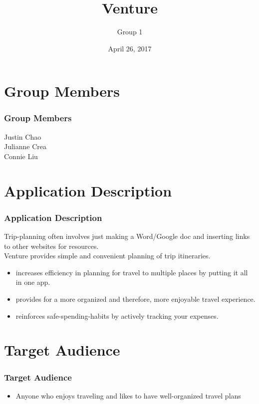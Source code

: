 \documentclass{beamer}
\title{Venture}
\author{Group 1}
\institute{CS 329E \\ The University of Texas at Austin}
\date{April 26, 2017}
\begin{document}
\frame{\titlepage}

\section{Group Members}
\begin{frame}
\frametitle{Group Members}
    \begin{center}
        Justin Chao \\
        Julianne Crea \\
        Connie Liu 
    \end{center}
\end{frame}

\section{Application Description}
\begin{frame}
\frametitle{Application Description}
        Trip-planning often involves just making a Word/Google doc and inserting links to
            other websites for resources. \\ 
        Venture provides simple and convenient planning of trip itineraries.
    \begin{itemize}
        \item increases efficiency in planning for travel to multiple places by putting it all in
            one app.
        \item provides for a more organized and therefore, more enjoyable travel experience.
        \item reinforces safe-spending-habits by actively tracking your expenses.
    \end{itemize}
\end{frame}

\section{Target Audience}
\begin{frame}
\frametitle{Target Audience}
    \begin{itemize}
        \item Anyone who enjoys traveling and likes to have well-organized travel plans
    \end{itemize}
\end{frame}
\end{document}
